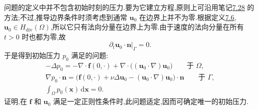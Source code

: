 \begin{note}[初始时刻的压力]
\label{note:time-dependent-initial-pressure}
问题的定义中并不包含初始时刻的压力.要为它建立方程,原则上可沿用笔记\hyperref[note:time-dependent-pressure-equation]{7.28} 的方法;不过,推导边界条件时须考虑到通常 $\bm{u}_0$ 在边界上并不为零.根据定义\hyperref[def:time-dependent-ns-weak-velocity]{7.6},$\bm{u}_0\in H_{\mathrm{div}}(\Omega)$,所以它只有法向分量在边界上为零.由于速度的法向分量在所有 $t>0$ 时也都为零,故
\[
  \left.\partial_t\bm{u}_0\cdot\bm{n}\right|_\Gamma=0.
\]
于是得到初始压力 $p_0$ 满足的问题:
\begin{equation}\label{eq:time-dependent-initial-pressure}
\begin{gathered}
  -\Delta p_0
    =-\nabla\cdot\bm{f}(0,\cdot)
      +\nabla\cdot\bigl((\bm{u}_0\cdot\nabla)\bm{u}_0\bigr)
      \qquad\text{于 }\Omega,\\
  \nabla p_0\cdot\bm{n}
    =\bigl(\bm{f}(0,\cdot)+\nu\Delta\bm{u}_0
      -(\bm{u}_0\cdot\nabla)\bm{u}_0\bigr)\cdot\bm{n}
      \qquad\text{于 }\Gamma,\\
  \int_\Omega p_0(\bm{x})\,\mathrm{d}\bm{x}=0.
\end{gathered}
\end{equation}
\textcite{HeywoodRannacher1982} 证明,在 $\bm{f}$ 和 $\bm{u}_0$ 满足一定正则性条件时,此问题适定,因而可确定唯一的初始压力.
\end{note}

